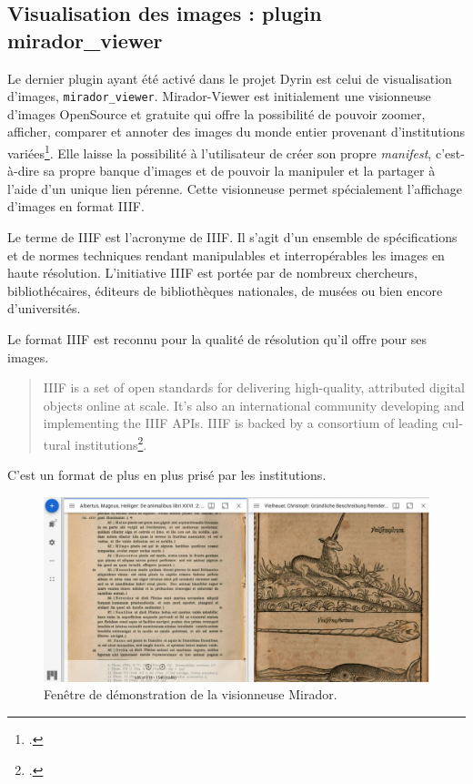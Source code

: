 \documentclass[a4paper,12pt,twoside]{book}
\begin{document}
\subsection{Visualisation des images : plugin mirador\_viewer}
Le dernier plugin ayant été activé dans le projet Dyrin est celui de visualisation d'images, \texttt{mirador\_viewer}. Mirador-Viewer est initialement une visionneuse d'images OpenSource et gratuite qui offre la possibilité de pouvoir zoomer, afficher, comparer et annoter des images du monde entier provenant d'institutions variées\footcite{mirador}. Elle laisse la possibilité à l'utilisateur de créer son propre \textit{manifest}, c'est-à-dire sa propre banque d'images et de pouvoir la manipuler et la partager à l'aide d'un unique lien pérenne. Cette visionneuse permet spécialement l'affichage d'images en format \acrshort{IIIF}.

Le terme de \acrshort{IIIF} est l'acronyme de \acrlong{IIIF}. Il s'agit d'un ensemble de spécifications et de normes techniques rendant manipulables et interropérables les images en haute résolution. L'initiative \acrshort{IIIF} est portée par de nombreux chercheurs, bibliothécaires, éditeurs de bibliothèques nationales, de musées ou bien encore d'universités.

Le format \acrshort{IIIF} est reconnu pour la qualité de résolution qu'il offre pour ses images.
\begin{otherlanguage}{english}
\begin{quote}
    IIIF is a set of open standards for delivering high-quality, attributed digital objects online at scale. It's also an international community developing and implementing the IIIF APIs. IIIF is backed by a consortium of leading cultural institutions\footcite{iiif}.
\end{quote}
\end{otherlanguage}
C'est un format de plus en plus prisé par les institutions.

\begin{figure}[H]
    \centering
    \includegraphics[width=\linewidth]{img/partie_3/mirador_demo.JPG}
    \caption{Fenêtre de démonstration de la visionneuse Mirador.}
    \label{mirador}
\end{figure}
\end{document}
